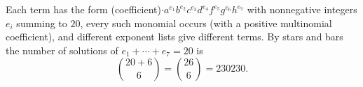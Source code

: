 Each term has the form (coefficient)$\cdot a^{e_1}b^{e_2}c^{e_3}d^{e_4}f^{e_5}g^{e_6}h^{e_7}$ with nonnegative integers $e_i$ summing to $20$, every such monomial occurs (with a positive multinomial coefficient), and different exponent lists give different terms. By stars and bars the number of solutions of $e_1+\cdots+e_7=20$ is
\[
\binom{20+6}{6}=\binom{26}{6}=\boxed{230230}.
\]
